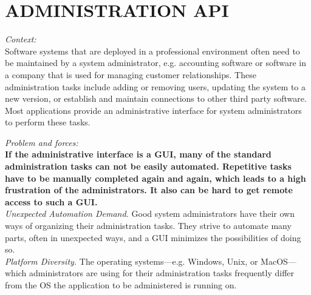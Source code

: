 \newpage

\section*{ADMINISTRATION API}

\textit{Context:}\\
Software systems that are deployed in a professional environment often need to be maintained by a system administrator, e.g. accounting software or software in a company that is used for managing customer relationships. These administration tasks include adding or removing users, updating the system to a new version, or establish and maintain connections to other third party software.
Most applications provide an administrative interface for system administrators to perform these tasks.
\begin{center}
  
\end{center}
\textit{Problem and forces:\\} %
\textbf{If the administrative interface is a GUI, many of the standard administration tasks can not be easily automated. Repetitive tasks have to be manually completed again and again, which leads to a high frustration of the administrators. It also can be hard to get remote access to such a GUI.}\\

\textit{Unexpected Automation Demand.} Good system administrators have their own ways of organizing their administration tasks. They strive to automate many parts, often in unexpected ways, and a GUI minimizes the possibilities of doing so.\\

\textit{Platform Diversity.} The operating systems---e.g. Windows, Unix, or MacOS---which administrators are using for their administration tasks frequently
differ from the OS the application to be administered is running on.\\

